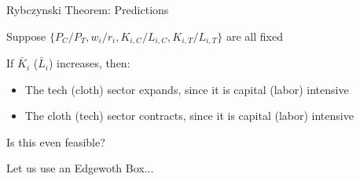 \documentclass[notes,11pt, aspectratio=169, xcolor=table]{beamer}
\newenvironment{wideitemize}{\itemize\addtolength{\itemsep}{10pt}}{\enditemize}
\begin{document}

\begin{frame}{Rybczynski Theorem: Predictions}

\begin{wideitemize}
    \item Suppose $\{ P_C/P_T, w_i/r_i, K_{i,C}/L_{i,C},K_{i,T}/L_{i,T}\}$ are all fixed

    \item If $\bar{K}_i$ ($\bar{L}_i$) increases, then:

    \begin{itemize}
        \item The tech (cloth) sector expands, since it is capital (labor) intensive
        \item The cloth (tech) sector contracts, since it is capital (labor) intensive
    \end{itemize}

    \item Is this even feasible?

    \item Let us use an Edgewoth Box...

\end{wideitemize}
\end{frame}
\end{document}
